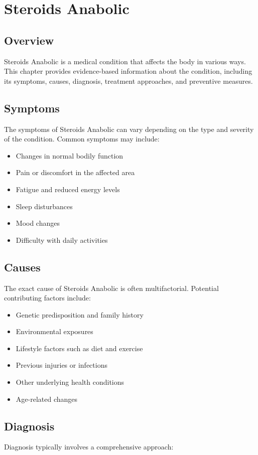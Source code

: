 \chapter{Steroids Anabolic}

\section*{Overview}
Steroids Anabolic is a medical condition that affects the body in various ways. This chapter provides evidence-based information about the condition, including its symptoms, causes, diagnosis, treatment approaches, and preventive measures.

\section*{Symptoms}
The symptoms of Steroids Anabolic can vary depending on the type and severity of the condition. Common symptoms may include:

\begin{itemize}
\item Changes in normal bodily function
\item Pain or discomfort in the affected area
\item Fatigue and reduced energy levels
\item Sleep disturbances
\item Mood changes
\item Difficulty with daily activities
\end{itemize}

\section*{Causes}
The exact cause of Steroids Anabolic is often multifactorial. Potential contributing factors include:

\begin{itemize}
\item Genetic predisposition and family history
\item Environmental exposures
\item Lifestyle factors such as diet and exercise
\item Previous injuries or infections
\item Other underlying health conditions
\item Age-related changes
\end{itemize}

\section*{Diagnosis}
Diagnosis typically involves a comprehensive approach:

